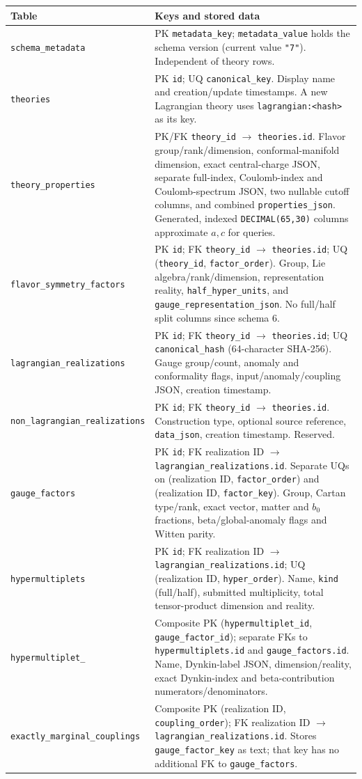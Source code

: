 \documentclass[11pt,a4paper]{article}
\renewcommand{\arraystretch}{1.2}
\numberwithin{equation}{section}
\newcommand{\code}[1]{{\small\nolinkurl{#1}}}
\begin{document}
{\small
\renewcommand{\arraystretch}{1.17}
\begin{tabularx}{\textwidth}{@{}p{53mm}Y@{}}
\toprule Table & Keys and stored data\\\midrule
\code{schema_metadata} &
PK \code{metadata_key}; \code{metadata_value} holds the schema version
(current value \code{"7"}). Independent of theory rows.\\[3pt]
\code{theories} &
PK \code{id}; UQ \code{canonical_key}. Display name and creation/update
timestamps. A new Lagrangian theory uses \code{lagrangian:<hash>} as its key.\\[3pt]
\code{theory_properties} &
PK/FK \code{theory_id} $\to$ \code{theories.id}. Flavor group/rank/dimension,
conformal-manifold dimension, exact central-charge JSON, separate full-index,
Coulomb-index and Coulomb-spectrum JSON, two nullable cutoff columns, and combined \code{properties_json}.
Generated, indexed \code{DECIMAL(65,30)} columns approximate $a,c$ for queries.\\[3pt]
\code{flavor_symmetry_factors} &
PK \code{id}; FK \code{theory_id} $\to$ \code{theories.id};
UQ (\code{theory_id}, \code{factor_order}). Group, Lie algebra/rank/dimension,
representation reality, \code{half_hyper_units}, and
\code{gauge_representation_json}. No full/half split columns since schema 6.\\[3pt]
\code{lagrangian_realizations} &
PK \code{id}; FK \code{theory_id} $\to$ \code{theories.id};
UQ \code{canonical_hash} (64-character SHA-256). Gauge group/count, anomaly and
conformality flags, input/anomaly/coupling JSON, creation timestamp.\\[3pt]
\code{non_lagrangian_realizations} &
PK \code{id}; FK \code{theory_id} $\to$ \code{theories.id}. Construction type,
optional source reference, \code{data_json}, creation timestamp. Reserved.\\[3pt]
\code{gauge_factors} &
PK \code{id}; FK realization ID $\to$ \code{lagrangian_realizations.id}.
Separate UQs on (realization ID, \code{factor_order}) and
(realization ID, \code{factor_key}). Group, Cartan type/rank, exact vector,
matter and $b_0$ fractions, beta/global-anomaly flags and Witten parity.\\[3pt]
\code{hypermultiplets} &
PK \code{id}; FK realization ID $\to$ \code{lagrangian_realizations.id};
UQ (realization ID, \code{hyper_order}). Name, \code{kind} (full/half),
submitted multiplicity, total tensor-product dimension and reality.\\[3pt]
\code{hypermultiplet_}\newline\code{representations} &
Composite PK (\code{hypermultiplet_id}, \code{gauge_factor_id}); separate
FKs to \code{hypermultiplets.id} and \code{gauge_factors.id}. Name,
Dynkin-label JSON, dimension/reality, exact Dynkin-index and beta-contribution
numerators/denominators.\\[3pt]
\code{exactly_marginal_couplings} &
Composite PK (realization ID, \code{coupling_order}); FK realization ID
$\to$ \code{lagrangian_realizations.id}. Stores \code{gauge_factor_key}
as text; that key has no additional FK to \code{gauge_factors}.\\\bottomrule
\end{tabularx}}
\end{document}
